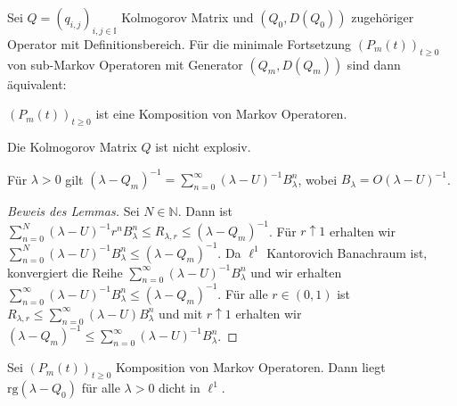 \documentclass[a4paper]{paper}
\numberwithin{equation}{satz}
\begin{document}
\begin{satz}
  Sei $Q=(q_{i,j})_{i,j\in\mathbb I}$ Kolmogorov Matrix und  $(Q_0, D(Q_0))$ zugehöriger Operator mit Definitionsbereich. Für die minimale Fortsetzung $(P_m(t))_{t\geq0}$ von sub-Markov Operatoren mit Generator $(Q_m, D(Q_m))$ sind dann äquivalent:
  \begin{compactenum}
      \item $(P_m(t))_{t\geq0}$ ist eine Komposition von Markov Operatoren.
      \item  Die Kolmogorov Matrix $Q$ ist nicht explosiv.
  \end{compactenum}
\end{satz}

\begin{lem} 
  Für $\lambda >0$ gilt  $(\lambda-Q_m)^{-1}=\sum_{n=0}^\infty (\lambda - U)^{-1} B_\lambda^n$, wobei $B_\lambda = O(\lambda-U)^{-1}$.
\end{lem}

\begin{proof}[Beweis des Lemmas]
  Sei $N\in\mathbb N$. Dann ist $\sum_{n=0}^N (\lambda - U)^{-1}r^n B_\lambda ^n\leq R_{\lambda, r}\leq (\lambda- Q_m)^{-1}$. Für $r\uparrow 1$ erhalten wir $\sum_{n=0}^N (\lambda-U)^{-1} B_\lambda ^n\leq (\lambda- Q_m)^{-1}$. Da $\ell^1$ Kantorovich Banachraum ist, konvergiert die Reihe $\sum_{n=0}^\infty (\lambda-U)^{-1}B_\lambda^n$ und wir erhalten $\sum_{n=0}^\infty (\lambda-U)^{-1}B_\lambda^n\leq (\lambda-Q_m)^{-1}$. Für alle $r\in(0,1)$ ist $R_{\lambda, r}\leq\sum_{n=0}^\infty (\lambda-U)B_\lambda^n$ und mit $r\uparrow 1$ erhalten wir $(\lambda-Q_m)^{-1}\leq\sum_{n=0}^\infty (\lambda-U)^{-1}B_\lambda ^n$.
\end{proof}

\begin{lem}
  Sei $(P_m(t))_{t\geq0}$ Komposition von Markov Operatoren. Dann liegt $\text{rg}(\lambda -Q_0)$ für alle $\lambda>0$ dicht in $\ell^1$. 
\end{lem}
\end{document}
